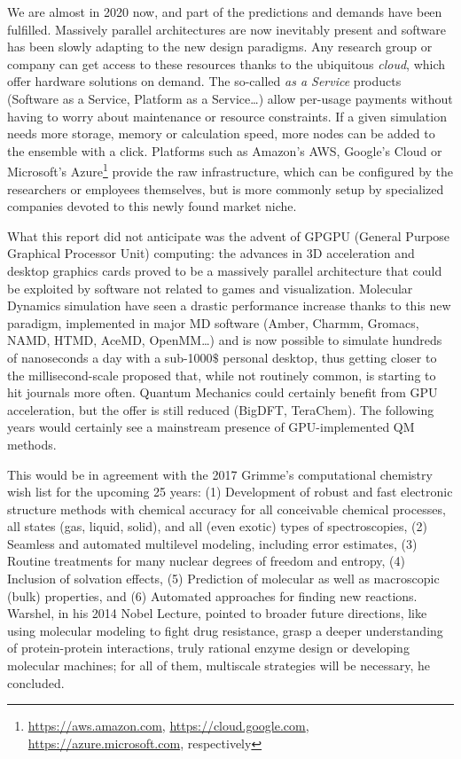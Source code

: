 We are almost in 2020 now, and part of the predictions and demands have been fulfilled. Massively parallel architectures are now inevitably present and software has been slowly adapting to the new design paradigms. Any research group or company can get access to these resources thanks to the ubiquitous \textit{cloud}, which offer hardware solutions on demand. The so-called \textit{as a Service}  products (Software as a Service, Platform as a Service\ldots) allow per-usage payments without having to worry about maintenance or resource constraints. If a given simulation needs more storage, memory or calculation speed, more nodes can be added to the ensemble with a click. Platforms such as Amazon's AWS, Google's Cloud or Microsoft's Azure\footnote{\url{https://aws.amazon.com}, \url{https://cloud.google.com}, \url{https://azure.microsoft.com}, respectively} provide the raw infrastructure, which can be configured by the researchers or employees themselves, but is more commonly setup by specialized companies devoted to this newly found market niche.

What this report did not anticipate was the advent of GPGPU (General Purpose Graphical Processor Unit) computing: the advances in 3D acceleration and desktop graphics cards proved to be a massively parallel architecture that could be exploited by software not related to games and visualization. Molecular Dynamics simulation have seen a drastic performance increase thanks to this new paradigm, implemented in major MD software (Amber, Charmm, Gromacs, NAMD, HTMD, AceMD, OpenMM\ldots) and is now possible to simulate hundreds of nanoseconds a day with a sub-1000$\$$  personal desktop, thus getting closer to the millisecond-scale proposed that, while not routinely common, is starting to hit journals more often.\cite{shaw2008anton,lane2013} Quantum Mechanics could certainly benefit from GPU acceleration, but the offer is still reduced (BigDFT,\cite{genovese2011daubechies} TeraChem\cite{luehr2011dynamic}). The following years would certainly see a mainstream presence of GPU-implemented QM methods.

This would be in agreement with the 2017 Grimme's computational chemistry wish list for the upcoming 25 years: (1) Development of robust and fast electronic structure methods with chemical accuracy for all conceivable chemical processes, all states (gas, liquid, solid), and all (even exotic) types of spectroscopies, (2) Seamless and automated multilevel modeling, including error estimates, (3) Routine treatments for many nuclear degrees of freedom and entropy, (4) Inclusion of solvation effects, (5) Prediction of molecular as well as macroscopic (bulk) properties, and (6) Automated approaches for finding new reactions. Warshel, in his 2014 Nobel Lecture, pointed to broader future directions, like using molecular modeling to fight drug resistance, grasp a deeper understanding of protein-protein interactions, truly rational enzyme design or developing molecular machines; for all of them, multiscale strategies will be necessary, he concluded.\cite{Warshel2014}

